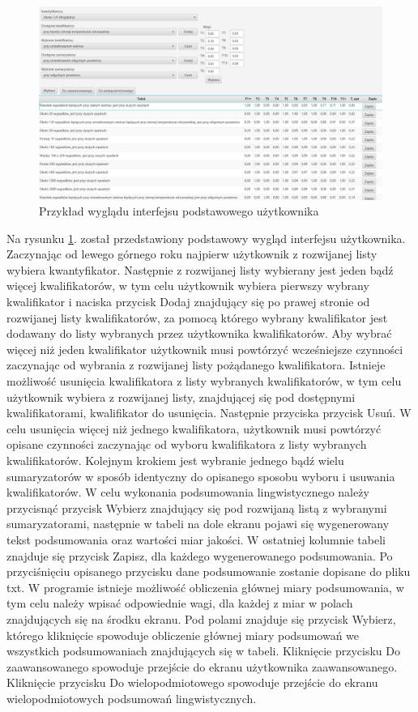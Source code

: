 \documentclass{classrep}
\begin{document}
\begin{figure}[h!]
\centering
\includegraphics[width=15cm]{gui.png}
\vspace{-0.3cm}
\caption{Przykład wyglądu interfejsu podstawowego użytkownika}
\label{gui}
\end{figure}

Na rysunku \ref{gui}. został przedstawiony podstawowy wygląd interfejsu użytkownika. Zaczynając od lewego górnego roku najpierw użytkownik z rozwijanej listy wybiera kwantyfikator. Następnie z rozwijanej listy wybierany jest jeden bądź więcej kwalifikatorów, w tym celu użytkownik wybiera pierwszy wybrany kwalifikator i naciska przycisk Dodaj znajdujący się po prawej stronie od rozwijanej listy kwalifikatorów, za pomocą którego wybrany kwalifikator jest dodawany do listy wybranych przez użytkownika kwalifikatorów. Aby wybrać więcej niż jeden kwalifikator użytkownik musi powtórzyć wcześniejsze czynności zaczynając od wybrania z rozwijanej listy pożądanego kwalifikatora. Istnieje możliwość usunięcia kwalifikatora z listy wybranych kwalifikatorów, w tym celu użytkownik wybiera z rozwijanej listy, znajdującej się pod dostępnymi kwalifikatorami, kwalifikator do usunięcia. Następnie przyciska przycisk Usuń. W celu usunięcia więcej niż jednego kwalifikatora, użytkownik musi powtórzyć opisane czynności zaczynając od wyboru kwalifikatora z listy wybranych kwalifikatorów. Kolejnym krokiem jest wybranie jednego bądź wielu sumaryzatorów w sposób identyczny do opisanego sposobu wyboru i usuwania kwalifikatorów. W celu wykonania podsumowania lingwistycznego należy przycisnąć przycisk Wybierz znajdujący się pod rozwijaną listą z wybranymi sumaryzatorami, następnie w tabeli na dole ekranu pojawi się wygenerowany tekst podsumowania oraz wartości miar jakości. W ostatniej kolumnie tabeli znajduje się przycisk Zapisz, dla każdego wygenerowanego podsumowania. Po przyciśnięciu opisanego przycisku dane podsumowanie zostanie dopisane do pliku txt. W programie istnieje możliwość obliczenia głównej miary podsumowania, w tym celu należy wpisać odpowiednie wagi, dla każdej z miar w polach znajdujących się na środku ekranu. Pod polami znajduje się przycisk Wybierz, którego kliknięcie spowoduje obliczenie głównej miary podsumowań we wszystkich podsumowaniach znajdujących się w tabeli. Kliknięcie przycisku Do zaawansowanego spowoduje przejście do ekranu użytkownika zaawansowanego. Kliknięcie przycisku Do wielopodmiotowego spowoduje przejście do ekranu wielopodmiotowych podsumowań lingwistycznych.
\end{document}
